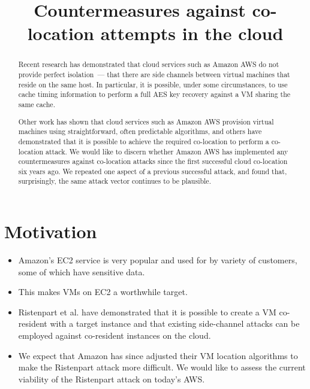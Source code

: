 \documentclass[conference]{IEEEtran}
\begin{document}
\title{Countermeasures against co-location attempts in the cloud}


\author{
}
\maketitle
\nocite{*}

\begin{abstract}
Recent research has demonstrated that cloud services such as Amazon AWS do not provide perfect isolation~--- that there
  are side channels between virtual machines that reside on the same host.
In particular, it is possible, under some circumstances, to use cache timing information to perform a full AES key
  recovery against a VM sharing the same cache.

Other work has shown that cloud services such as Amazon AWS provision virtual machines using straightforward, often
  predictable algorithms, and others have demonstrated that it is possible to achieve the required co-location to
  perform a co-location attack.
We would like to discern whether Amazon AWS has implemented any countermeasures against co-location attacks since the
  first successful cloud co-location six years ago.
We repeated one aspect of a previous successful attack, and found that, surprisingly, the same attack vector continues
  to be plausible.
\end{abstract}

\section{Motivation}

\begin{itemize}
  \item Amazon's EC2 service is very popular and used for by variety of customers, some of which have sensitive data.
  \item This makes VMs on EC2 a worthwhile target.
  \item Ristenpart et al. have demonstrated that it is possible to create a VM co-resident with a target instance and
    that existing side-channel attacks can be employed against co-resident instances on the cloud.
  \item We expect that Amazon has since adjusted their VM location algorithms to make the Ristenpart attack more
    difficult. We would like to assess the current viability of the Ristenpart attack on today's AWS.
\end{itemize}
\end{document}
